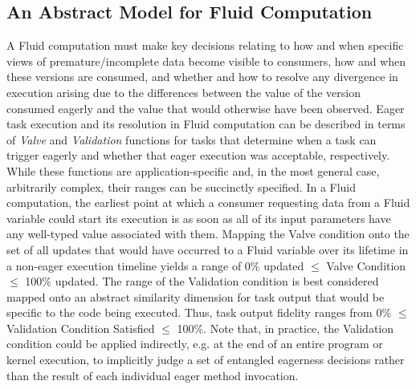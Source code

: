 \subsection{An Abstract Model for Fluid Computation}

A Fluid computation must make key decisions relating to how and when specific views of premature/incomplete data become visible to consumers, how and when these versions are consumed, and whether and how to resolve any divergence in execution arising due to the differences between the value of the version consumed eagerly and the value that would otherwise have been observed. Eager task execution and its resolution in Fluid computation can be described in terms of \textit{Valve} and \textit{Validation} functions for tasks that determine when a task can trigger eagerly and whether that eager execution was acceptable, respectively. While these functions are application-specific and, in the most general case, arbitrarily complex, their ranges can be succinctly specified. In a Fluid computation, the earliest point at which a consumer requesting data from a Fluid variable could start its execution is as soon as all of its input parameters have any well-typed value associated with them. Mapping the Valve condition onto the set of all updates that would have occurred to a Fluid variable over its lifetime in a non-eager execution timeline yields a range of 0\% updated $\leq$ Valve Condition $\leq$ 100\% updated. The range of the Validation condition is best considered mapped onto an abstract similarity dimension for task output that would be specific to the code being executed. Thus, task output fidelity ranges from 0\% $\leq$ Validation Condition Satisfied $\leq$ 100\%. Note that, in practice, the Validation condition could be applied indirectly, e.g. at the end of an entire program or kernel execution, to implicitly judge a set of entangled eagerness decisions rather than the result of each individual eager method invocation.

